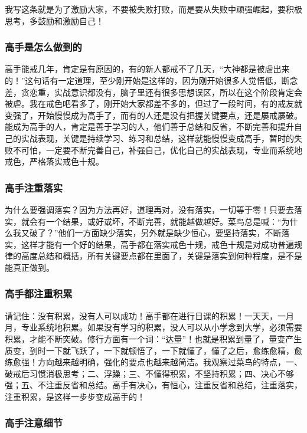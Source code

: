 我写这条就是为了激励大家，不要被失败打败，而是要从失败中顽强崛起，要积极思考，多鼓励和激励自己！

\subsubsection{高手是怎么做到的}

高手能戒几年，肯定是有原因的，有的新人都戒不了几天，“大神都是被虐出来的！”这句话有一定道理，至少刚开始是这样的，因为刚开始很多人觉悟低，断念差，贪恋重，实战意识都没有，脑子里还有很多思想误区，所以在这个阶段肯定会被虐。我在戒色吧看多了，刚开始大家都差不多的，但过了一段时间，有的戒友就变强了，开始慢慢成为高手了，而有的人还是没有把握关键要点，还是屡戒屡破。能成为高手的人，肯定是善于学习的人，他们善于总结和反省，不断完善和提升自己的实战表现，关键是持续学习、练习和总结，这样就能慢慢变成高手，暂时的失败不可怕，一定要不断完善自己，补强自己，优化自己的实战表现，专业而系统地戒色，严格落实戒色十规。

\subsubsection{高手注重落实}

为什么要强调落实？因为方法再好，道理再对，没有落实，一切等于零！只要去落实，就会有一个结果，或好或坏，不断完善，就能越做越好。菜鸟总是喊：“为什么我又破了？”他们一方面缺少落实，另外就是缺少恒心，要坚持落实，不断落实，这样才能有一个好的结果，高手都在落实戒色十规，戒色十规是对成功普遍规律的高度总结和概括，所有关键要点都在里面了，关键是落实到何种程度，是不是能真正做到。

\subsubsection{高手都注重积累}

请记住：没有积累，没有人可以成功！高手都在进行日课的积累！一天天，一月月，专业系统地积累。如果没有学习的积累，没人可以从小学念到大学，必须需要积累，才能不断突破。修行方面有一个词：“达量”！也就是积累到量了，量变产生质变，到时一下就飞跃了，一下就顿悟了，一下就懂了，懂了之后，愈练愈精，愈练愈强！方向越来越明确，强化的要点也越来越简洁。我观察过菜鸟的特点，一、破戒后习惯消极思考；二、浮躁；三、不懂得积累，不坚持积累；四、决心不够强；五、不注重反省和总结。高手有决心，有恒心，注重反省和总结，注重落实，注重积累，是这样一步步变成高手的！

\subsubsection{高手注意细节}

